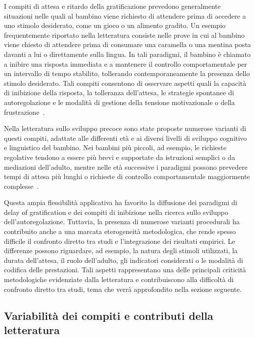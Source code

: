             I compiti di attesa e ritardo della gratificazione prevedono generalmente situazioni nelle quali al bambino viene richiesto di attendere prima di accedere a uno stimolo desiderato, come un gioco o un alimento gradito. Un esempio frequentemente riportato nella letteratura consiste nelle prove in cui al bambino viene chiesto di attendere prima di consumare una caramella o una mentina posta davanti a lui o direttamente sulla lingua. In tali paradigmi, il bambino è chiamato a inibire una risposta immediata e a mantenere il controllo comportamentale per un intervallo di tempo stabilito, tollerando contemporaneamente la presenza dello stimolo desiderato. Tali compiti consentono di osservare aspetti quali la capacità di inibizione della risposta, la tolleranza dell'attesa, le strategie spontanee di autoregolazione e le modalità di gestione della tensione motivazionale o della frustrazione~\cite{kochanska2000,mischel1989}.

            Nella letteratura sullo sviluppo precoce sono state proposte numerose varianti di questi compiti, adattate alle differenti età e ai diversi livelli di sviluppo cognitivo e linguistico del bambino. Nei bambini più piccoli, ad esempio, le richieste regolative tendono a essere più brevi e supportate da istruzioni semplici o da mediazioni dell'adulto, mentre nelle età successive i paradigmi possono prevedere tempi di attesa più lunghi o richieste di controllo comportamentale maggiormente complesse~\cite{carlson2005,garon2008}.

            Questa ampia flessibilità applicativa ha favorito la diffusione dei paradigmi di delay of gratification e dei compiti di inibizione nella ricerca sullo sviluppo dell'autoregolazione. Tuttavia, la presenza di numerose varianti procedurali ha contribuito anche a una marcata eterogeneità metodologica, che rende spesso difficile il confronto diretto tra studi e l'integrazione dei risultati empirici. Le differenze possono riguardare, ad esempio, la natura degli stimoli utilizzati, la durata dell'attesa, il ruolo dell'adulto, gli indicatori considerati o le modalità di codifica delle prestazioni. Tali aspetti rappresentano una delle principali criticità metodologiche evidenziate dalla letteratura e contribuiscono alla difficoltà di confronto diretto tra studi, tema che verrà approfondito nella sezione seguente.

        \subsection{Variabilità dei compiti e contributi della letteratura}
        \label{sec:3_4_3}

